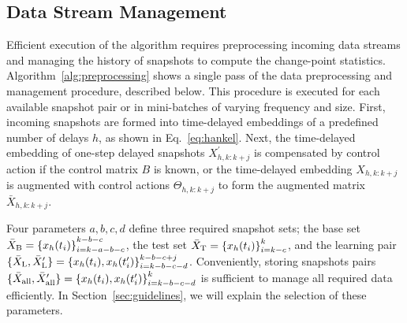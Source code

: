 \subsection{Data Stream Management}
Efficient execution of the algorithm requires preprocessing incoming data streams and managing the history of snapshots to compute the change-point statistics. Algorithm~\ref{alg:preprocessing} shows a single pass of the data preprocessing and management procedure, described below. This procedure is executed for each available snapshot pair or in mini-batches of varying frequency and size. First, incoming snapshots are formed into time-delayed embeddings of a predefined number of delays \( h \), as shown in Eq.~\eqref{eq:hankel}. Next, the time-delayed embedding of one-step delayed snapshots \( X^\prime_{h, k: k + j} \) is compensated by control action if the control matrix \( B \) is known, or the time-delayed embedding \( X_{h, k: k + j} \) is augmented with control actions \( \Theta_{h, k: k + j} \) to form the augmented matrix \( \bar{X}_{h, k: k + j} \).

Four parameters \(a, b, c, d\) define three required snapshot sets; the base set \({\bar{X} _{\text{B}} = \{x_h(t_i)\}}^{k - b - c}_{i=k - a - b - c}\), the test set \(\bar{X} _{\text{T}} = {\{x_h(t_i)\}}^{k}_{i=k - c}\), and the learning pair \( \{\bar{X} _{\text{L}}, \bar{X}^\prime _{\text{L}}\} = {\{x_h(t_i), x_h(t_i^\prime )\}}^{k - b - c + j}_{i=k - b - c - d}\). Conveniently, storing snapshots pairs \( \{\bar{X} _{\text{all}}, \bar{X}^\prime _{\text{all}}\} = {\{x_h(t_i), x_h(t_i^\prime )\}}^{k}_{i=k - b - c - d}\) is sufficient to manage all required data efficiently. In Section~\ref{sec:guidelines}, we will explain the selection of these parameters.

